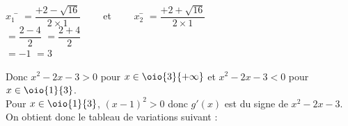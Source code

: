 \documentclass[a4paper,11pt,exos]{nsi} %
\begin{document}
{\begin{enumerate}
        \begin{tabbing}
            $x_1$ \= $=\dfrac{+2-\sqrt{16}}{2\times 1} \qquad$ et $\qquad x_2$\= $=\dfrac{+2+\sqrt{16}}{2\times 1}$\\[.5em]
            \> $=\dfrac{2-4}{2}$  \> $=\dfrac{2+4}{2}$\\[.5em]
            \> $=-1$ \> $=3$
        \end{tabbing}
        Donc $x^2-2x-3>0$ pour $x\in\oio{3}{+\infty}$ et $x^2-2x-3<0$ pour $x\in\oio{1}{3}$.\\[1em]
        Pour $x\in\oio{1}{3}$, $(x-1)^2>0$ donc $g'(x)$ est du signe de $x^2-2x-3$.\\
        On obtient donc le tableau de variations suivant :
        \begin{center}
        \end{center}
    \end{enumerate}
}
\end{document}
